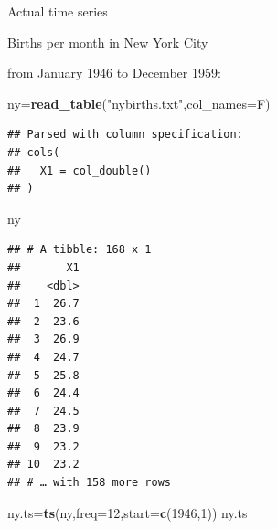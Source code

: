 \documentclass[ignorenonframetext,]{beamer}
\newenvironment{Shaded}{\begin{snugshade}}{\end{snugshade}}
\newcommand{\DataTypeTok}[1]{\textcolor[rgb]{0.13,0.29,0.53}{#1}}
\newcommand{\DecValTok}[1]{\textcolor[rgb]{0.00,0.00,0.81}{#1}}
\newcommand{\KeywordTok}[1]{\textcolor[rgb]{0.13,0.29,0.53}{\textbf{#1}}}
\newcommand{\NormalTok}[1]{#1}
\newcommand{\StringTok}[1]{\textcolor[rgb]{0.31,0.60,0.02}{#1}}
\begin{document}
\begin{frame}[fragile]{Actual time series}
\begin{block}{Births per month in New York City}

from January 1946 to December 1959:

\begin{Shaded}
\begin{Highlighting}[]
\NormalTok{ny=}\KeywordTok{read_table}\NormalTok{(}\StringTok{"nybirths.txt"}\NormalTok{,}\DataTypeTok{col_names=}\NormalTok{F)}
\end{Highlighting}
\end{Shaded}

\begin{verbatim}
## Parsed with column specification:
## cols(
##   X1 = col_double()
## )
\end{verbatim}

\begin{Shaded}
\begin{Highlighting}[]
\NormalTok{ny}
\end{Highlighting}
\end{Shaded}

\begin{verbatim}
## # A tibble: 168 x 1
##       X1
##    <dbl>
##  1  26.7
##  2  23.6
##  3  26.9
##  4  24.7
##  5  25.8
##  6  24.4
##  7  24.5
##  8  23.9
##  9  23.2
## 10  23.2
## # … with 158 more rows
\end{verbatim}

\begin{Shaded}
\begin{Highlighting}[]
\NormalTok{ny.ts=}\KeywordTok{ts}\NormalTok{(ny,}\DataTypeTok{freq=}\DecValTok{12}\NormalTok{,}\DataTypeTok{start=}\KeywordTok{c}\NormalTok{(}\DecValTok{1946}\NormalTok{,}\DecValTok{1}\NormalTok{))}
\NormalTok{ny.ts}
\end{Highlighting}
\end{Shaded}


\end{block}
\end{frame}
\end{document}
